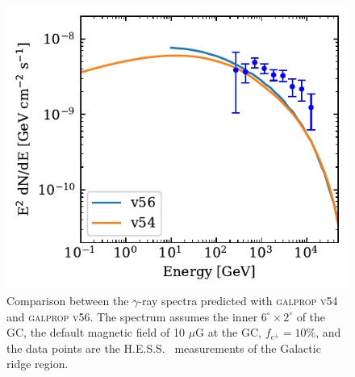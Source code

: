 \documentclass[doublespace,draft,nopageskip]{VTthesis} %
\begin{document}
\begin{appendices}
\begin{figure}
\end{figure}


\begin{figure}
    \begin{center}
    \includegraphics[scale =1.0]{Figures/CTA/compare.pdf}
    \caption{Comparison between the $\gamma$-ray spectra predicted with \textsc{galprop v54} and \textsc{galprop v56}. The spectrum assumes the inner $6^\circ \times 2^\circ$ of the GC, the default magnetic field of 10 $\mu$G at the GC, $f_{e^\pm}=10\%$, and the data points are the H.E.S.S.~\citep{Aharonian:2006au} measurements of the Galactic ridge region.   }\label{fig:compareV54andV56}
    \end{center}
    
\end{figure}



\end{appendices}
\end{document}
